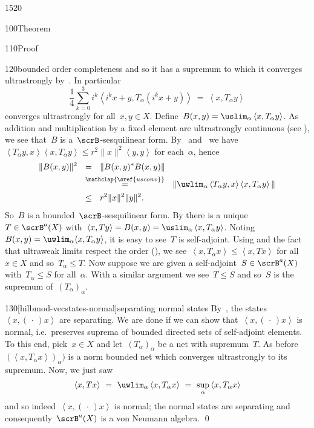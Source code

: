 \begin{parsec}{1520}
\begin{point}{100}{Theorem}
\begin{point}{110}{Proof}
\begin{point}{120}{bounded order completeness}
    and so it has a supremum to which
    it converges ultrastrongly by~.
In particular
\begin{equation*}
\frac{1}{4} \sum^3_{k=0} i^k \left< i^kx+y, T_\alpha(i^k x+y)\right>
    \ =\  \left<x, T_\alpha y\right>
\end{equation*}
converges ultrastrongly for all~$x,y \in X$.
Define~$B(x,y) = \uslim_\alpha \left<x,T_\alpha y\right>$.
As addition and multiplication by a fixed element are
    ultrastrongly continuous (see ),
    we see that~$B$ is a~$\scrB$-sesquilinear form.
By~ and~
    we have~$\left<T_\alpha y, x\right>\left<x, T_\alpha y\right>
        \leq r^2 \|x\|^2 \left<y,y\right>$
    for each~$\alpha$, hence
\begin{align*}
    \| B(x,y) \|^2 &\ \ = \ \ 
    \| B(x,y)^* B(x,y) \| \\
    &\ \ \overset{\mathclap{\sref{usconv}}}{=} \ \ \| \uwlim_\alpha \left<T_\alpha y, x\right>\left< x, T_\alpha y\right>\| \\
    &\ \ \leq \ \  r^2 \|x\|^2 \|y\|^2.
\end{align*}
So~$B$ is a bounded~$\scrB$-sesquilinear form.
By 
    there is a unique~$T \in \scrB^a(X)$
    with~$\left<x,Ty\right> = B(x,y) = \uslim_\alpha \left<x,T_\alpha y\right>$.
Noting~$B(x,y) = \uwlim_\alpha \langle x, T_\alpha y \rangle$,
    it is easy to see~$T$ is self-adjoint.
Using  and 
the fact that ultraweak limits respect the order (),
    we see~$\left<x,T_\alpha x\right> \leq \left<x,T x\right>$
    for all~$x \in X$ and so~$T_\alpha \leq T$.
Now suppose we are given a self-adjoint~$S \in \scrB^a(X)$
    with~$T_\alpha \leq S$ for all~$\alpha$.
With a similar argument we see~$T \leq S$ and so~$S$ is
    the supremum of~$(T_\alpha)_\alpha$.
\end{point}
\begin{point}{130}[hilbmod-vecstates-normal]{separating normal states}%
By~\sref{hilbmod-ordersep},
    the states~$\left<x,(\,\cdot\,)x\right>$
    are separating.
We are done if we can show that~$\left<x,(\,\cdot\,)x\right>$
    is normal, i.e.~preserves suprema of bounded directed sets of
    self-adjoint elements.
To this end, pick~$x \in X$ and let~$(T_\alpha)_\alpha$
    be a net with supremum~$T$.
As before~$(\left<x,T_\alpha x\right>)_\alpha)$
    is a norm bounded net which converges ultrastrongly to its
    supremum.
Now, we just saw
\begin{equation*}
    \left<x,Tx\right> \ =\  \uwlim_\alpha \left<x, T_\alpha x\right>
               \  =\  \sup_\alpha \left<x, T_\alpha x\right>
\end{equation*}
and so indeed~$\left<x, (\,\cdot\,)x\right>$ is normal;
the normal states are separating
and consequently~$\scrB^a(X)$ is a von Neumann algebra. \qed
\end{point}
\end{point}
\end{point}
\end{parsec}

